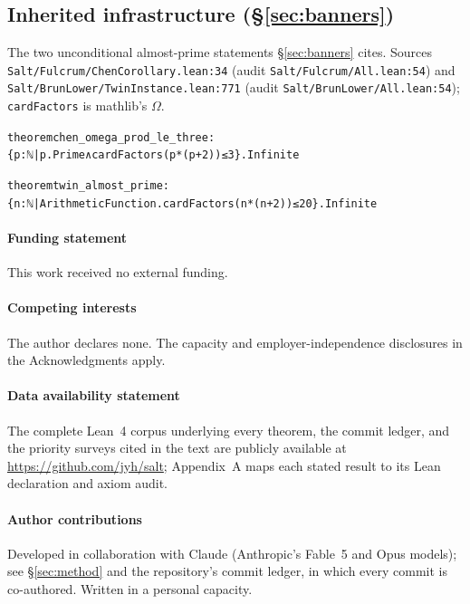 \documentclass{CUP-JNL-FMP}
\newcommand{\leaninline}[1]{{\small\texttt{#1}}}
\theoremstyle{remark}
\begin{document}
\subsection{Inherited infrastructure (\S\ref{sec:banners})}

\medskip\noindent The two unconditional almost-prime statements
\S\ref{sec:banners} cites. Sources
\leaninline{Salt/Fulcrum/ChenCorollary.lean:34} (audit
\leaninline{Salt/Fulcrum/All.lean:54}) and
\leaninline{Salt/BrunLower/TwinInstance.lean:771} (audit
\leaninline{Salt/BrunLower/All.lean:54}); \leaninline{cardFactors} is
\textsf{mathlib}'s $\Omega$.
{\footnotesize\begin{alltt}
theorem chen_omega_prod_le_three :
    \{p : ℕ | p.Prime ∧ cardFactors (p * (p + 2)) ≤ 3\}.Infinite

theorem twin_almost_prime :
    \{n : ℕ | ArithmeticFunction.cardFactors (n * (n + 2)) ≤ 20\}.Infinite
\end{alltt}}

\paragraph{Funding statement}
This work received no external funding.

\paragraph{Competing interests}
The author declares none. The capacity and employer-independence
disclosures in the Acknowledgments apply.

\paragraph{Data availability statement}
The complete Lean~4 corpus underlying every theorem, the commit ledger,
and the priority surveys cited in the text are publicly available at
\url{https://github.com/jyh/salt}; Appendix~A maps each stated result to
its Lean declaration and axiom audit.

\paragraph{Author contributions}
Developed in collaboration with Claude (Anthropic's Fable~5 and
Opus models); see \S\ref{sec:method} and the repository's commit ledger,
in which every commit is co-authored. Written in a personal capacity.
\end{document}
